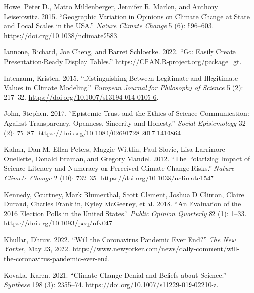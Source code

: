 \documentclass[
  letterpaper,
  DIV=11,
  numbers=noendperiod]{scrartcl}
\newlength{\cslhangindent}
\newlength{\cslentryspacingunit} %
\newenvironment{CSLReferences}[2] %
 {%
  \setlength{\parindent}{0pt}
  \ifodd #1
  \let\oldpar\par
  \def\par{\hangindent=\cslhangindent\oldpar}
  \fi
  \setlength{\parskip}{#2\cslentryspacingunit}
 }%
 {}
\begin{document}
\begin{CSLReferences}{1}{0}
\leavevmode{}%
Howe, Peter D., Matto Mildenberger, Jennifer R. Marlon, and Anthony
Leiserowitz. 2015. {``Geographic Variation in Opinions on Climate Change
at State and Local Scales in the USA.''} \emph{Nature Climate Change} 5
(6): 596--603. \url{https://doi.org/10.1038/nclimate2583}.

\leavevmode{}%
Iannone, Richard, Joe Cheng, and Barret Schloerke. 2022. {``Gt: Easily
Create Presentation-Ready Display Tables.''}
\url{https://CRAN.R-project.org/package=gt}.

\leavevmode{}%
Intemann, Kristen. 2015. {``Distinguishing Between Legitimate and
Illegitimate Values in Climate Modeling.''} \emph{European Journal for
Philosophy of Science} 5 (2): 217--32.
\url{https://doi.org/10.1007/s13194-014-0105-6}.

\leavevmode{}%
John, Stephen. 2017. {``Epistemic Trust and the Ethics of Science
Communication: Against Transparency, Openness, Sincerity and Honesty.''}
\emph{Social Epistemology} 32 (2): 75--87.
\url{https://doi.org/10.1080/02691728.2017.1410864}.

\leavevmode{}%
Kahan, Dan M, Ellen Peters, Maggie Wittlin, Paul Slovic, Lisa Larrimore
Ouellette, Donald Braman, and Gregory Mandel. 2012. {``The Polarizing
Impact of Science Literacy and Numeracy on Perceived Climate Change
Risks.''} \emph{Nature Climate Change} 2 (10): 732--35.
\url{https://doi.org/10.1038/nclimate1547}.

\leavevmode{}%
Kennedy, Courtney, Mark Blumenthal, Scott Clement, Joshua D Clinton,
Claire Durand, Charles Franklin, Kyley McGeeney, et al. 2018. {``An
Evaluation of the 2016 Election Polls in the United States.''}
\emph{Public Opinion Quarterly} 82 (1): 1--33.
\url{https://doi.org/10.1093/poq/nfx047}.

\leavevmode{}%
Khullar, Dhruv. 2022. {``Will the Coronavirus Pandemic Ever End?''}
\emph{The New Yorker}, May 23, 2022.
\url{https://www.newyorker.com/news/daily-comment/will-the-coronavirus-pandemic-ever-end}.

\leavevmode{}%
Kovaka, Karen. 2021. {``Climate Change Denial and Beliefs about
Science.''} \emph{Synthese} 198 (3): 2355--74.
\url{https://doi.org/10.1007/s11229-019-02210-z}.


\end{CSLReferences}
\end{document}
